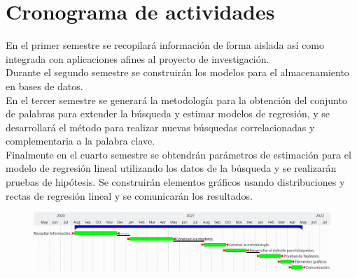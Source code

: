 \section {Cronograma de actividades}\noindent
En el primer semestre se recopilará información de forma aislada así como integrada con aplicaciones afines al proyecto de investigación.\\
Durante el segundo semestre se construirán los modelos para el almacenamiento en bases de datos.\\
En el tercer semestre se generará la metodología para la obtención del conjunto de palabras para extender la búsqueda y estimar modelos de regresión, y se desarrollará el método para realizar nuevas búsquedas correlacionadas y complementaria a la palabra clave.\\
Finalmente en el cuarto semestre se obtendrán parámetros de estimación para el modelo de regresión lineal utilizando los datos de la búsqueda y se realizarán pruebas de hipótesis. Se construirán elementos gráficos usando distribuciones y rectas de regresión lineal y se comunicarán los resultados.
\begin{figure}[H]\centering\includegraphics[width=1\linewidth]{gantt.png}\end{figure}